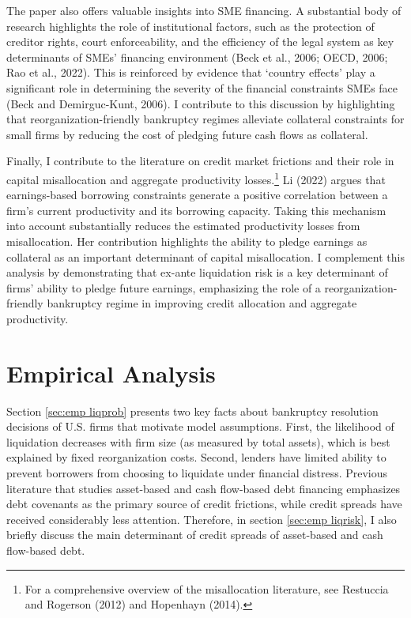 \documentclass[12pt]{article}
\begin{document}
The paper also offers valuable insights into SME financing. A substantial body of research highlights the role of institutional factors, such as the protection of creditor rights, court enforceability, and the efficiency of the legal system as key determinants of SMEs' financing environment (Beck et al., 2006; OECD, 2006; Rao et al., 2022). This is reinforced by evidence that `country effects' play a significant role in determining the severity of the financial constraints SMEs face (Beck and Demirguc-Kunt, 2006). I contribute to this discussion by highlighting that reorganization-friendly bankruptcy regimes alleviate collateral constraints for small firms by reducing the cost of pledging future cash flows as collateral.

Finally, I contribute to the literature on credit market frictions and their role in capital misallocation and aggregate productivity losses.\footnote{For a comprehensive overview of the misallocation literature, see Restuccia and Rogerson (2012) and Hopenhayn (2014).} Li (2022) argues that earnings-based borrowing constraints generate a positive correlation between a firm's current productivity and its borrowing capacity. Taking this mechanism into account substantially reduces the estimated productivity losses from misallocation. Her contribution highlights the ability to pledge earnings as collateral as an important determinant of capital misallocation. I complement this analysis by demonstrating that ex-ante liquidation risk is a key determinant of firms' ability to pledge future earnings, emphasizing the role of a reorganization-friendly bankruptcy regime in improving credit allocation and aggregate productivity. 

\section{Empirical Analysis \label{sec:empirical analysis}}

Section \ref{sec:emp liqprob} presents two key facts about bankruptcy resolution decisions of U.S. firms that motivate model assumptions. First, the likelihood of liquidation decreases with firm size (as measured by total assets), which is best explained by fixed reorganization costs. Second, lenders have limited ability to prevent borrowers from choosing to liquidate under financial distress. Previous literature that studies asset-based and cash flow-based debt financing emphasizes debt covenants as the primary source of credit frictions, while credit spreads have received considerably less attention. Therefore, in section \ref{sec:emp liqrisk}, I also briefly discuss the main determinant of credit spreads of asset-based and cash flow-based debt. 
\end{document}
